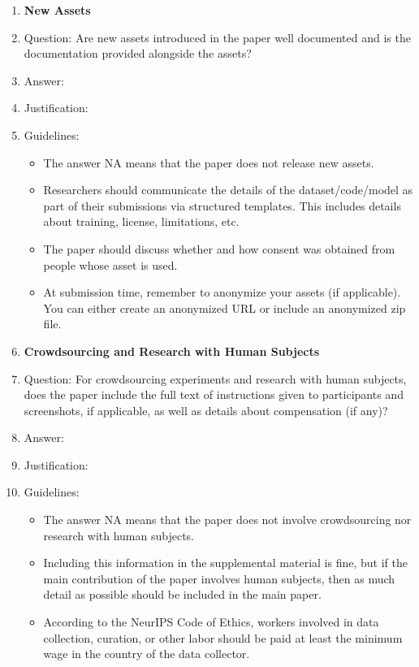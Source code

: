 \documentclass{article}
\begin{document}
\begin{enumerate}
\item {\bf New Assets}
    \item[] Question: Are new assets introduced in the paper well documented and is the documentation provided alongside the assets?
    \item[] Answer: \answerNA{} %
    \item[] Justification: \answerNA{}
    \item[] Guidelines:
    \begin{itemize}
        \item The answer NA means that the paper does not release new assets.
        \item Researchers should communicate the details of the dataset/code/model as part of their submissions via structured templates. This includes details about training, license, limitations, etc. 
        \item The paper should discuss whether and how consent was obtained from people whose asset is used.
        \item At submission time, remember to anonymize your assets (if applicable). You can either create an anonymized URL or include an anonymized zip file.
    \end{itemize}

\item {\bf Crowdsourcing and Research with Human Subjects}
    \item[] Question: For crowdsourcing experiments and research with human subjects, does the paper include the full text of instructions given to participants and screenshots, if applicable, as well as details about compensation (if any)? 
    \item[] Answer: \answerNA{} %
    \item[] Justification: \answerNA{}
    \item[] Guidelines:
    \begin{itemize}
        \item The answer NA means that the paper does not involve crowdsourcing nor research with human subjects.
        \item Including this information in the supplemental material is fine, but if the main contribution of the paper involves human subjects, then as much detail as possible should be included in the main paper. 
        \item According to the NeurIPS Code of Ethics, workers involved in data collection, curation, or other labor should be paid at least the minimum wage in the country of the data collector. 
    \end{itemize}


\end{enumerate}
\end{document}
